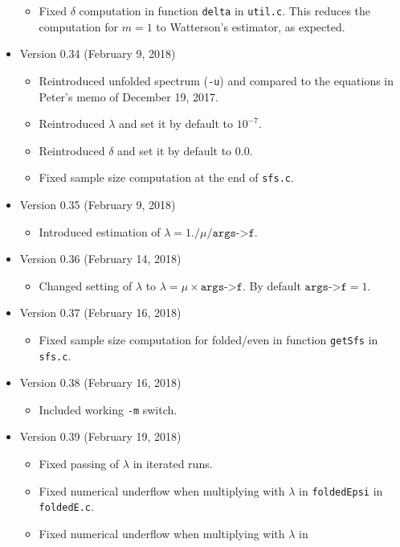 \documentclass[a4paper]{article}
\newcommand{\ty}{\texttt}
\begin{document}
\begin{itemize}
\begin{itemize}
    \item Fixed $\delta$ computation in function \ty{delta} in
      \ty{util.c}. This reduces the computation for $m=1$ to
      Watterson's estimator, as expected.
  \end{itemize}
\item Version 0.34 (February 9, 2018)
  \begin{itemize}
    \item Reintroduced unfolded spectrum (\ty{-u}) and compared to the equations
      in Peter's memo of December 19, 2017.
    \item Reintroduced $\lambda$ and set it by default to $10^{-7}$.
    \item Reintroduced $\delta$ and set it by default to $0.0$.
    \item Fixed sample size computation at the end of \ty{sfs.c}.
  \end{itemize}
\item Version 0.35 (February 9, 2018)
  \begin{itemize}
  \item Introduced estimation of $\lambda=1./\mu/\texttt{args->f}$.
  \end{itemize}
\item Version 0.36 (February 14, 2018)
  \begin{itemize}
    \item Changed setting of $\lambda$ to
      $\lambda=\mu\times\texttt{args->f}$. By default
      $\texttt{args->f}=1$.
  \end{itemize}
\item Version 0.37 (February 16, 2018)
  \begin{itemize}
    \item Fixed sample size computation for folded/even in function
      \ty{getSfs} in \ty{sfs.c}.
  \end{itemize}
\item Version 0.38 (February 16, 2018)
  \begin{itemize}
  \item Included working \ty{-m} switch.
  \end{itemize}
\item Version 0.39 (February 19, 2018)
  \begin{itemize}
  \item Fixed passing of $\lambda$ in iterated runs.
  \item Fixed numerical underflow when multiplying with $\lambda$ in
    \ty{foldedEpsi} in \ty{foldedE.c}.
  \item Fixed numerical underflow when multiplying with $\lambda$ in

\end{itemize}
\end{itemize}
\end{document}
